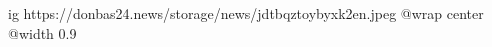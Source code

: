  
 
 
 
 

\ifcmt
  ig https://donbas24.news/storage/news/jdtbqztoybyxk2en.jpeg
  @wrap center
  @width 0.9
\fi
